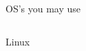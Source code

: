\begin{frame}{OS's you may use}
\begin{columns}[T]
		Linux\\
		\uncover<2->{\textcolor{green}{recommended}}
		\centering

\end{columns}
\end{frame}
